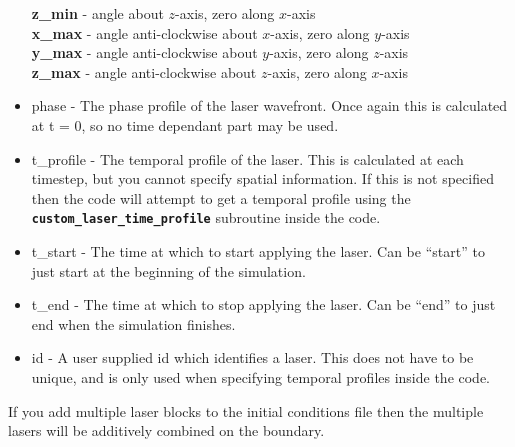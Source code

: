 \documentclass[12pt,a4paper]{article}
\newcommand{\inlinecode}[1]{{\color{warwickred} \bf\texttt{#1}}}
\newcommand{\inlineemph}[1]{{\color{warwicklight} \bf{#1}}}
\begin{document}
\begin{itemize}
\inlineemph{z\_min} - angle about $z$-axis, zero along $x$-axis\\
\inlineemph{x\_max} - angle anti-clockwise about $x$-axis, zero along $y$-axis\\
\inlineemph{y\_max} - angle anti-clockwise about $y$-axis, zero along $z$-axis\\
\inlineemph{z\_max} - angle anti-clockwise about $z$-axis, zero along $x$-axis
\item phase - The phase profile of the laser wavefront. Once again this is
  calculated at t = 0, so no time dependant part may be used.
\item t\_profile - The temporal profile of the laser. This is calculated at
  each timestep, but you cannot specify spatial information. If this is not
  specified then the code will attempt to get a temporal profile using the
  \inlinecode{custom\_laser\_time\_profile} subroutine inside the code.
\item t\_start - The time at which to start applying the laser. Can be
  ``start'' to just start at the beginning of the simulation.
\item t\_end - The time at which to stop applying the laser. Can be ``end'' to
  just end when the simulation finishes.
\item id - A user supplied id which identifies a laser. This does not have to
  be unique, and is only used when specifying temporal profiles inside the
  code.
\end{itemize}

If you add multiple laser blocks to the initial conditions file then the
multiple lasers will be additively combined on the boundary.
\end{document}
